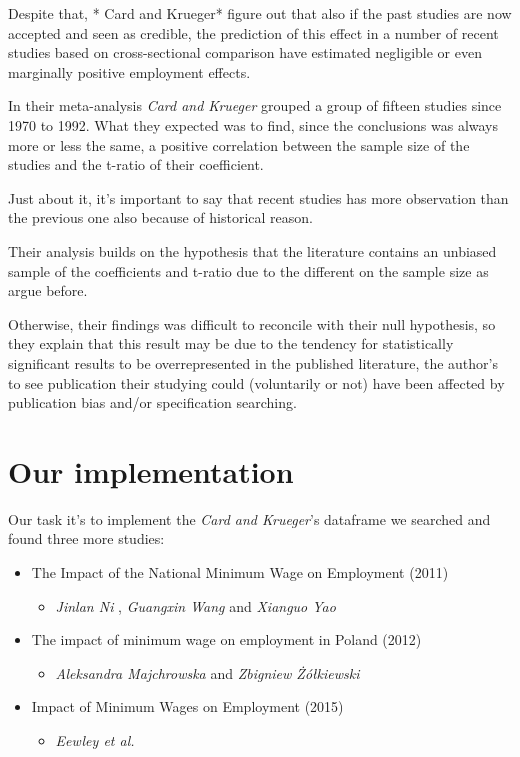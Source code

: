 \documentclass[
]{article}
\providecommand{\tightlist}{%
  \setlength{\itemsep}{0pt}\setlength{\parskip}{0pt}}
\begin{document}
Despite that, * Card and Krueger* figure out that also if the past
studies are now accepted and seen as credible, the prediction of this
effect in a number of recent studies based on cross-sectional comparison
have estimated negligible or even marginally positive employment
effects.

In their meta-analysis \emph{Card and Krueger} grouped a group of
fifteen studies since 1970 to 1992. What they expected was to find,
since the conclusions was always more or less the same, a positive
correlation between the sample size of the studies and the t-ratio of
their coefficient.

Just about it, it's important to say that recent studies has more
observation than the previous one also because of historical reason.

Their analysis builds on the hypothesis that the literature contains an
unbiased sample of the coefficients and t-ratio due to the different on
the sample size as argue before.

Otherwise, their findings was difficult to reconcile with their null
hypothesis, so they explain that this result may be due to the tendency
for statistically significant results to be overrepresented in the
published literature, the author's to see publication their studying
could (voluntarily or not) have been affected by publication bias and/or
specification searching.

\hypertarget{our-implementation}{%
\section{Our implementation}\label{our-implementation}}

Our task it's to implement the \emph{Card and Krueger}'s dataframe we
searched and found three more studies:

\begin{itemize}
\tightlist
\item
  The Impact of the National Minimum Wage on Employment (2011)

  \begin{itemize}
  \tightlist
  \item
    \emph{Jinlan Ni} , \emph{Guangxin Wang} and \emph{Xianguo Yao}
  \end{itemize}
\item
  The impact of minimum wage on employment in Poland (2012)

  \begin{itemize}
  \tightlist
  \item
    \emph{Aleksandra Majchrowska} and \emph{Zbigniew Żółkiewski}
  \end{itemize}
\item
  Impact of Minimum Wages on Employment (2015)

  \begin{itemize}
  \tightlist
  \item
    \emph{Eewley et al.}
  \end{itemize}
\end{itemize}
\end{document}
